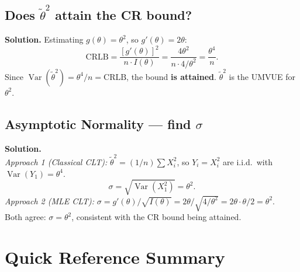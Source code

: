 \documentclass[11pt,a4paper]{article}
\newcommand{\Var}{\operatorname{Var}}
\begin{document}
\subsection{Does $\tilde\theta^2$ attain the CR bound?}

\vspace{80pt}

\textbf{Solution.} Estimating $g(\theta)=\theta^2$, so $g'(\theta)=2\theta$:
\[
  \text{CRLB} = \frac{[g'(\theta)]^2}{n\cdot I(\theta)} = \frac{4\theta^2}{n\cdot 4/\theta^2} = \frac{\theta^4}{n}.
\]
Since $\Var(\tilde\theta^2) = \theta^4/n = \text{CRLB}$, the bound \textbf{is attained}. $\tilde\theta^2$ is the UMVUE for $\theta^2$.

\subsection{Asymptotic Normality — find $\sigma$}

\vspace{80pt}

\textbf{Solution.}\\[4pt]
\textit{Approach 1 (Classical CLT):} $\tilde\theta^2 = (1/n)\sum X_i^2$, so $Y_i=X_i^2$ are i.i.d.\ with $\Var(Y_1)=\theta^4$.
\[
  \sigma = \sqrt{\Var(X_1^2)} = \theta^2.
\]
\textit{Approach 2 (MLE CLT):} $\sigma = g'(\theta)/\sqrt{I(\theta)} = 2\theta/\sqrt{4/\theta^2} = 2\theta\cdot\theta/2 = \theta^2$.\\[4pt]
Both agree: $\boxed{\sigma = \theta^2}$, consistent with the CR bound being attained.

\newpage
\section{Quick Reference Summary}
\end{document}

